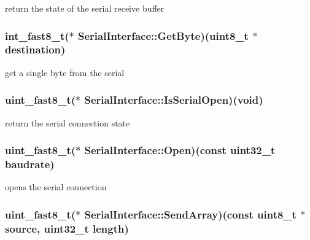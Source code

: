 return the state of the serial receive buffer 

\hypertarget{struct_serial_interface_a318df81760d2f0b0fb209fc39594b45e}{
\subsubsection[{Get\-Byte}]{\setlength{\rightskip}{0pt plus 5cm}int\-\_\-fast8\-\_\-t($\ast$ Serial\-Interface\-::\-Get\-Byte)(uint8\-\_\-t $\ast$destination)}}\label{struct_serial_interface_a318df81760d2f0b0fb209fc39594b45e}


get a single byte from the serial 

\hypertarget{struct_serial_interface_aa12245208003c78ea024ad24f9d84f2a}{
\subsubsection[{Is\-Serial\-Open}]{\setlength{\rightskip}{0pt plus 5cm}uint\-\_\-fast8\-\_\-t($\ast$ Serial\-Interface\-::\-Is\-Serial\-Open)(void)}}\label{struct_serial_interface_aa12245208003c78ea024ad24f9d84f2a}


return the serial connection state 

\hypertarget{struct_serial_interface_ab506189cbcec1de46dfc75142fb82068}{
\subsubsection[{Open}]{\setlength{\rightskip}{0pt plus 5cm}uint\-\_\-fast8\-\_\-t($\ast$ Serial\-Interface\-::\-Open)(const uint32\-\_\-t baudrate)}}\label{struct_serial_interface_ab506189cbcec1de46dfc75142fb82068}


opens the serial connection 

\hypertarget{struct_serial_interface_a2f49f38e4a372077a2755eb5e7884b35}{
\subsubsection[{Send\-Array}]{\setlength{\rightskip}{0pt plus 5cm}uint\-\_\-fast8\-\_\-t($\ast$ Serial\-Interface\-::\-Send\-Array)(const uint8\-\_\-t $\ast$source, uint32\-\_\-t length)}}\label{struct_serial_interface_a2f49f38e4a372077a2755eb5e7884b35}



